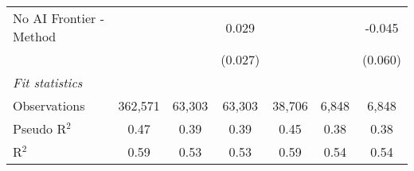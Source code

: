 \begin{tabular}{lcccccc}
   No AI Frontier - Method &               &               & 0.029         &               &              & -0.045\\   
                           &               &               & (0.027)       &               &              & (0.060)\\   
   \midrule
   \emph{Fit statistics}\\
   Observations            & 362,571       & 63,303        & 63,303        & 38,706        & 6,848        & 6,848\\  
   Pseudo R$^2$            & 0.47          & 0.39          & 0.39          & 0.45          & 0.38         & 0.38\\  
   R$^2$                   & 0.59          & 0.53          & 0.53          & 0.59          & 0.54         & 0.54\\  
   

\end{tabular}
